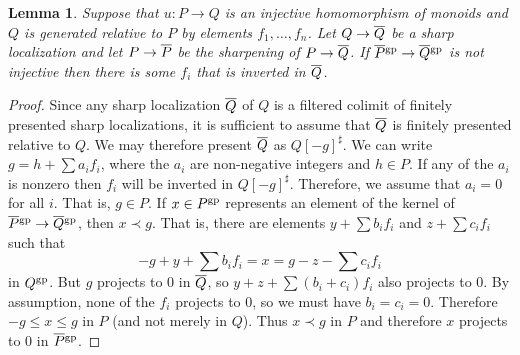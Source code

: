 \documentclass[10pt]{article}
\numberwithin{equation}{section}
\newtheorem{lemma}[paragraph]{Lemma}
\theoremstyle{definition}
\theoremstyle{remark}
\newcommand{\gp}[1]{#1^{\rm gp}}
\renewcommand{\bar}[1]{\overnorm{#1}\vphantom{#1}}
\def\overnorm#1{\overline{#1}\vphantom{#1}}
\begin{document}
\begin{lemma} \label{lem:18}
	Suppose that $u : P \to Q$ is an injective homomorphism of monoids and $Q$ is generated relative to $P$ by elements $f_1, \ldots, f_n$.  Let $Q \to \bar Q$ be a sharp localization and let $P \to \bar P$ be the sharpening of $P \to \bar Q$.  If $\bar P^{\rm gp} \to \bar Q^{\rm gp}$ is not injective then there is some $f_i$ that is inverted in $\bar Q$.
\end{lemma}
\begin{proof}
	Since any sharp localization $\bar Q$ of $Q$ is a filtered colimit of finitely presented sharp localizations, it is sufficient to assume that $\bar Q$ is finitely presented relative to $Q$.  We may therefore present $\bar Q$ as $Q[-g]^\sharp$.  We can write $g = h + \sum a_i f_i$, where the $a_i$ are non-negative integers and $h \in P$.  If any of the $a_i$ is nonzero then $f_i$ will be inverted in $Q[-g]^\sharp$.  Therefore, we assume that $a_i = 0$ for all $i$.  That is, $g \in P$.  If $x \in P^{\rm gp}$ represents an element of the kernel of $\bar P^{\rm gp} \to \bar Q^{\rm gp}$, then $x \prec g$.  That is, there are elements $y + \sum b_i f_i$ and $z + \sum c_i f_i$ such that
	\begin{equation*}
		-g + y + \sum b_i f_i = x = g - z - \sum c_i f_i  
	\end{equation*}
	in $\gp Q$.  But $g$ projects to $0$ in $\bar Q$, so $y + z + \sum (b_i + c_i) f_i$ also projects to $0$.  By assumption, none of the $f_i$ projects to $0$, so we must have $b_i = c_i = 0$.  Therefore $-g \leq x \leq g$ in $P$ (and not merely in $Q$).  Thus $x \prec g$ in $P$ and therefore $x$ projects to $0$ in $\bar P^{\rm gp}$.
\end{proof}
\end{document}
